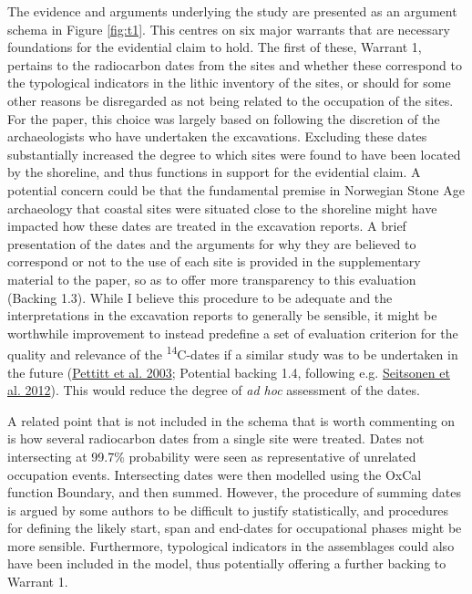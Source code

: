 \documentclass[
  12pt,
  a4paper,
  oneside]{book}
\begin{document}
The evidence and arguments underlying the study are presented as an argument schema in Figure \ref{fig:t1}. This centres on six major warrants that are necessary foundations for the evidential claim to hold. The first of these, Warrant 1, pertains to the radiocarbon dates from the sites and whether these correspond to the typological indicators in the lithic inventory of the sites, or should for some other reasons be disregarded as not being related to the occupation of the sites. For the paper, this choice was largely based on following the discretion of the archaeologists who have undertaken the excavations. Excluding these dates substantially increased the degree to which sites were found to have been located by the shoreline, and thus functions in support for the evidential claim. A potential concern could be that the fundamental premise in Norwegian Stone Age archaeology that coastal sites were situated close to the shoreline might have impacted how these dates are treated in the excavation reports. A brief presentation of the dates and the arguments for why they are believed to correspond or not to the use of each site is provided in the supplementary material to the paper, so as to offer more transparency to this evaluation (Backing 1.3). While I believe this procedure to be adequate and the interpretations in the excavation reports to generally be sensible, it might be worthwhile improvement to instead predefine a set of evaluation criterion for the quality and relevance of the \textsuperscript{14}C-dates if a similar study was to be undertaken in the future (\protect\hyperlink{ref-pettitt2003}{Pettitt et al. 2003}; Potential backing 1.4, following e.g. \protect\hyperlink{ref-seitsonen2012}{Seitsonen et al. 2012}). This would reduce the degree of \emph{ad hoc} assessment of the dates.

A related point that is not included in the schema that is worth commenting on is how several radiocarbon dates from a single site were treated. Dates not intersecting at 99.7\% probability were seen as representative of unrelated occupation events. Intersecting dates were then modelled using the OxCal function Boundary, and then summed. However, the procedure of summing dates is argued by some authors to be difficult to justify statistically, and procedures for defining the likely start, span and end-dates for occupational phases might be more sensible. Furthermore, typological indicators in the assemblages could also have been included in the model, thus potentially offering a further backing to Warrant 1.
\end{document}

